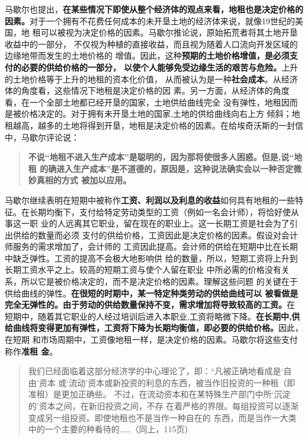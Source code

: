 马歇尔也提出，\textbf{在某些情况下即使从整个经济体的观点来看，地租也是决定价格的
  因素。}对于一个拥有不花费任何成本的未开垦土地的经济体来说，就像19世纪的美国，地
租可以被视为决定价格的因素。马歇尔推论说，原始拓荒者将其土地开垦收益中的一部分，
不仅视为种植的直接收益，而且视为随着人口流向开发区域的边缘地带而发生的土地价格的
增值。因此，这种\textbf{预期的土地价格增值，是必须支付的必要的供给价格的一部分，
  以使个人能够免受边缘生活的艰苦与危险。}上升的土地价格等于上升的地租的资本化价值，
从而被认为是一种\textbf{社会成本}。从经济体的角度看，这些情况下地租是决定价格的因
素。另一方面，从经济体的角度看，在一个全部土地都已经开垦的国家，土地供给曲线完全
没有弹性，地租因而是被价格决定的。对于拥有未开垦土地的国家,土地的供给曲线向右上方
倾斜；地租越高，越多的土地将得到开垦，地租是决定价格的因素。在给埃奇沃斯的一封信
中，马歇尔评论说：
\begin{quotation}
  \textbf{不说“地租不进入生产成本”是聪明的，因为那将使很多人困惑。但是,说“地租
    的确进入生产成本”是不道德的，原因是，这种说法确实会以一种否定微妙真相的方式
    被加以应用。}
\end{quotation}

马歇尔继续表明在短期中被称作\textbf{工资、利润以及利息的收益}如何具有地租的一些特
征。在长期均衡下，支付给特定劳动类型的工资（例如一名会计师），将恰好使从事这一职
业的人远离其它职业，留在现在的职业上。这一长期工资是社会为了引出供给的数量而必须
支付的供给价格，工资因此是决定价格的因素。假设对会计师服务的需求增加了，会计师的
工资因此提高。会计师的供给在短期中比在长期中缺乏弹性。工资的提高不会极大地影响供
给的数量，所以，短期工资将上升到长期工资水平之上。较高的短期工资与使个人留在职业
中所必需的价格没有关系，所以它是被价格决定的，而不是决定价格的因素。理解这些问题
的关键在于供给曲线的弹性。\textbf{在很短的时期中，某一特定种类劳动的供给曲线可以
  被看做是完全无弹性的。由于劳动的供给数量保持不变，需求增加将导致较高的工资。}在
短期中，随着其它职业的人经过培训后进入本职业,工资将略微下降。\textbf{在长期中,供
  给曲线将变得更加有弹性，工资将下降为长期均衡值，即必要的供给价格。}因此，在短期
和市场周期中，工资像地租一样，是决定价格的因素。马歇尔将这些支付称作\textbf{准租
  金}。

\begin{quotation}
  我们已经面临着这部分经济学的中心理论了，即：“凡被正确地看成是‘自由’资本
  或‘流动’资本或新投资的利息的东西，被当作旧投资的一种租（即准租）是更加正确些。
  不过，在流动资本和在某特殊生产部门中所‘沉淀的’资本之间，在新旧投资之间，不存
  在着严格的界限。每组投资可以逐渐变成另一组投资。即使地租也不是当作一种自在的
  东西，而是当作一大类中的一个主要的种看待的……（同上，115页）
\end{quotation}

